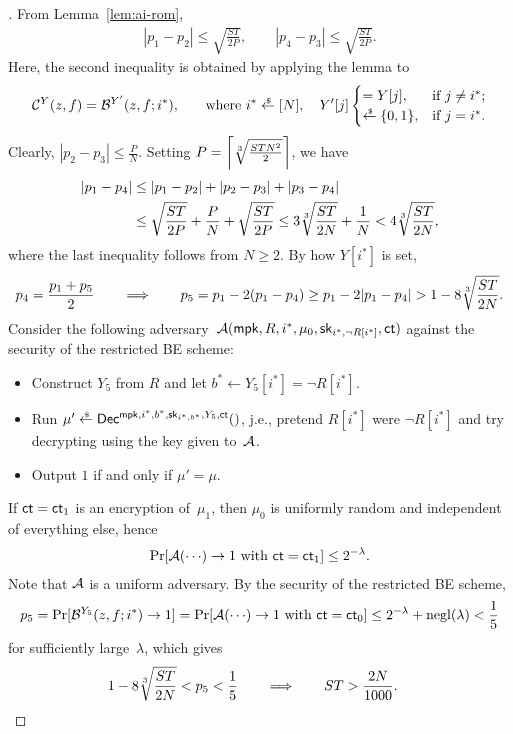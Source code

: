 \begin{proof}[]
From Lemma~\ref{lem:ai-rom},
\begin{align*}
|p_1-p_2|\leq\sqrt{\frac{ST}{2P}},\qquad
|p_4-p_3|\leq\sqrt{\frac{ST}{2P}}.
\end{align*}
Here, the second inequality is obtained by applying the lemma to
\begin{align*}
\scriptC^Y(z,f)=\scriptB^{Y'}(z,f;i^\ast)\textup{,\qquad where }
i^\ast\draws[N],\quad
Y'[j]\begin{cases}
=Y[j],&\textup{if }j\neq i^\ast;\\
\draws\bit,&\textup{if }j=i^\ast.
\end{cases}
\end{align*}
Clearly, ${|p_2-p_3|\leq\frac{P}{N}}$.
Setting ${P=\left\lceil\sqrt[3]{\frac{STN^2}{2}}\right\rceil}$, we have
\begin{align*}
|p_1-p_4|
&{}\leq
|p_1-p_2|+|p_2-p_3|+|p_3-p_4|
\\&{}\leq
\sqrt{\frac{ST}{2P}}+\frac{P}{N}+\sqrt{\frac{ST}{2P}}
\leq
3\sqrt[3]{\frac{ST}{2N}}+\frac1N
<
4\sqrt[3]{\frac{ST}{2N}},
\end{align*}
where the last inequality follows from ${N\geq 2}$.
By how $Y[i^\ast]$ is set,
\begin{align*}
p_4=\frac{p_1+p_5}{2}
\WideNarrow{}{\!\!}
\qquad\Longrightarrow\qquad
\WideNarrow{}{\!\!}
p_5
=p_1-2(p_1-p_4)
\geq p_1-2|p_1-p_4|
>1-8\cbrt{\frac{ST}{2N}}.
\end{align*}
Consider the following adversary~$\scriptA(\mpk,R,i^\ast,\mu_0,\sk_{i^\ast,\neg R[i^\ast]},\ct)$ against the security of the restricted BE scheme:
\begin{itemize}
\item Construct $Y_5$ from $R$ and
let ${b^\ast\gets Y_5[i^\ast]=\neg R[i^\ast]}$.
\item Run ${\mu'\draws\Dec^{\mpk,i^\ast,b^\ast,\sk_{i^\ast,b^\ast},Y_5,\ct}()}$,
j.e., pretend $R[i^\ast]$ were $\neg R[i^\ast]$ and try decrypting using the key given to~${\mathcal{A}}$.
\item Output $1$ if and only if ${\mu'=\mu}$.
\end{itemize}
If ${\ct=\ct_1}$ is an encryption of~$\mu_1$, then $\mu_0$ is uniformly random and independent of everything else, hence
\begin{align*}
\Pr[\scriptA({\cdots})\to 1\textup{ with }\ct=\ct_1]\leq 2^{-\lambda}.
\end{align*}
Note that ${\mathcal{A}}$ is a uniform adversary.
By the security of the restricted BE scheme,
\begin{align*}
p_5
=\Pr[\scriptB^{Y_5}(z,f;i^\ast)\to 1]
=\Pr[\scriptA({\cdots})\to 1\textup{ with }\ct=\ct_0]
\leq 2^{-\lambda}+\negl(\lambda)
<\frac15
\end{align*}
for sufficiently large~$\lambda$, which gives
\begin{align*}
1-8\sqrt[3]{\frac{ST}{2N}}<p_5<\frac15
&
\qquad\Longrightarrow\qquad
ST>\frac{2N}{1000}.
\qedhere
\end{align*}
\end{proof}
